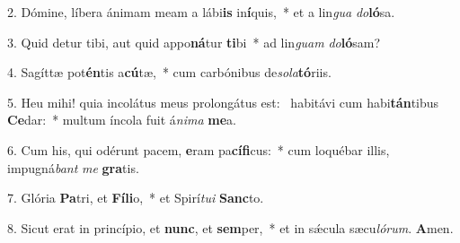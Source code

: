 2. Dómine, líbera ánimam meam a lábi\textbf{is} in\textbf{í}quis,~*  et a lin\textit{gua} \textit{do}\textbf{ló}sa.\

3. Quid detur tibi, aut quid appo\textbf{ná}tur \textbf{ti}bi~*  ad lin\textit{guam} \textit{do}\textbf{ló}sam?\

4. Sagíttæ pot\textbf{én}tis a\textbf{cú}tæ,~*  cum carbónibus de\textit{so}\textit{la}\textbf{tó}riis.\

5. Heu mihi! quia incolátus meus prolongátus est: \dag\  habitávi cum habi\textbf{tán}tibus \textbf{Ce}dar:~*  multum íncola fuit á\textit{ni}\textit{ma} \textbf{me}a.\

6. Cum his, qui odérunt pacem, \textbf{e}ram pa\textbf{cí}\textbf{fi}cus:~*  cum loquébar illis, impugná\textit{bant} \textit{me} \textbf{gra}tis.\

7. Glória \textbf{Pa}tri, et \textbf{Fí}\textbf{li}o,~*  et Spirí\textit{tu}\textit{i} \textbf{Sanc}to.\

8. Sicut erat in princípio, et \textbf{nunc}, et \textbf{sem}per,~*  et in sǽcula sæcu\textit{ló}\textit{rum}. \textbf{A}men.\

